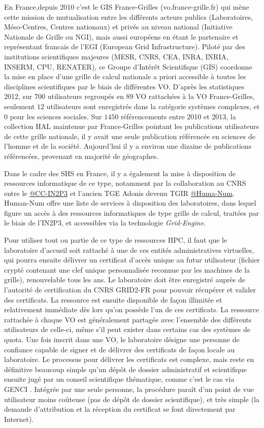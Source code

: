En France,depuis 2010 c'est le GIS France-Grilles (vo.france-grille.fr) qui mène cette mission de mutualisation entre les différents acteurs publics (Laboratoires, Méso-Centres, Centres nationaux) et privés au niveau national (Initiative Nationale de Grille ou NGI), mais aussi européens en étant le partenaire et représentant francais de l'EGI (European Grid Infrastructure). Piloté par des institutions scientifiques majeures (MESR, CNRS, CEA, INRA, INRIA, INSERM, CPU, RENATER), ce Groupe d'Intérêt Scientifique (GIS) coordonne la mise en place d'une grille de calcul nationale a priori accessible à toutes les disciplines scientifiques par le biais de différentes VO. D'après les statistiques 2012, sur $700$ utilisateurs regroupés en $89$ VO rattachées à la VO France-Grilles, seulement $12$ utilisateurs sont enregistrés dans la catégorie systèmes complexes, et $0$ pour les sciences sociales. Sur $\num{1450}$ référencements entre 2010 et 2013, la collection HAL maintenue par France-Grilles pointant les publications utilisateurs de cette grille nationale, il y avait une seule publication référencée en sciences de l'homme et de la société. Aujourd'hui il y a environ une dizaine de publications référencées, provenant en majorité de géographes.

Dans le cadre des SHS en France, il y a également la mise à disposition de ressources informatique de ce type, notamment par la collaboration au CNRS entre le \href{http://cc.in2p3.fr/}{@CC-IN2P3} et l'ancien TGE Adonis devenu TGIR \href{http://www.huma-num.fr/}{@Huma-Num}. Human-Num offre une liste de services à disposition des laboratoires, dans lequel figure un accès à des ressources informatiques de type grille de calcul, traitées par le biais de l'IN2P3, et accessibles via la technologie \textit{Grid-Engine}.

Pour utiliser tout ou partie de ce type de ressources HPC, il faut que le laboratoire d'accueil soit rattaché à une de ces entités administratives virtuelles, qui pourra ensuite délivrer un certificat d'accès unique au futur utilisateur (fichier crypté contenant une clef unique personnalisée reconnue par les machines de la grille), renouvelable tous les ans. Le laboratoire doit être enregistré auprès de l'autorité de certification du CNRS GRID2-FR pour pouvoir récupérer et valider des certificats. La ressource est ensuite disponible de façon illimitée et relativement immédiate dès lors qu'on possède l'un de ces certificats. La ressource rattachée à chaque VO est généralement partagée avec l'ensemble des différents utilisateurs de celle-ci, même s'il peut exister dans certains cas des systèmes de quota. Une fois inscrit dans une VO, le laboratoire désigne une personne de confiance capable de signer et de délivrer des certificats de façon locale au laboratoire. Le processus pour délivrer les certificats est complexe, mais reste en définitive beaucoup simple qu'un dépôt de dossier administratif et scientifique ensuite jugé par un conseil scientifique thématique, comme c'est le cas via GENCI \autocites{GENCI2014,GENCI2015}. Intégrée par une seule personne, la procédure paraît d'un point de vue utilisateur moins coûteuse (pas de dépôt de dossier scientifique), et très simple (la demande d'attribution et la réception du certificat se font directement par Internet).

